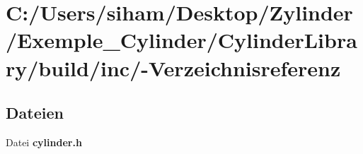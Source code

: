 \section{C:/Users/siham/Desktop/Zylinder/Exemple\_\-Cylinder/Cylinder\-Library/build/inc/-Verzeichnisreferenz}
\label{dir_C_3A_2FUsers_2Fsiham_2FDesktop_2FZylinder_2FExemple_5FCylinder_2FCylinderLibrary_2Fbuild_2Finc_2F}


\subsection*{Dateien}
\begin{CompactItemize}
\item 
Datei {\bf cylinder.h}
\end{CompactItemize}
